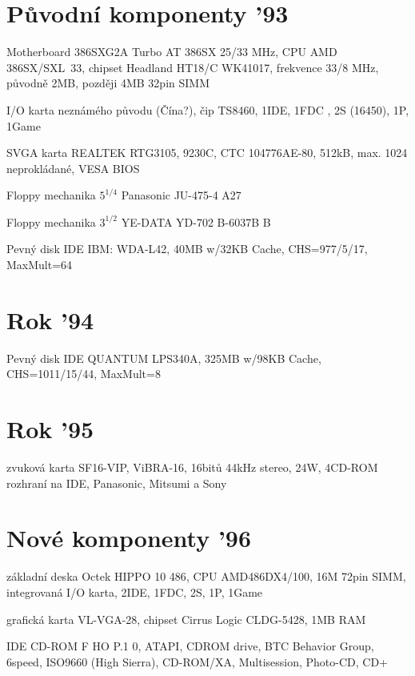 \section{Původní komponenty '93}
\item{\oldsym}
   Motherboard {\sc 386SXG2A Turbo AT 386SX 25/33 MHz}, CPU {\sc AMD
   386SX/SXL~33}, chipset {\sc Headland HT18/C WK41017}, frekvence 33/8 MHz,
   původně 2MB, později 4MB 32pin SIMM
\item{\oldsym}
   I/O karta neznámého původu (Čína?), čip {\sc TS8460}, 1\krat IDE,
    1\krat FDC , 2\krat S
   (16450), 1\krat P, 1\krat Game
\item{\oldsym}
   SVGA karta {\sc REALTEK RTG3105, 9230C}, {\sc CTC 104776AE-80},
   512kB, max. 1024 neprokládané,  VESA BIOS 
\item{\newsym}
   Floppy mechanika $5^{1/4}$ {\sc Panasonic JU-475-4 A27}
\item{\newsym}
   Floppy mechanika $3^{1/2}$ {\sc YE-DATA YD-702 B-6037B B}
\item{\newsym}
   Pevný disk IDE {\sc IBM: WDA-L42, 40MB w/32KB Cache, CHS=977/5/17,
   MaxMult=64}
   
\section{Rok '94}
\item{\newsym}
   Pevný disk IDE {\sc QUANTUM LPS340A, 325MB w/98KB Cache, CHS=1011/15/44,
   MaxMult=8}
\section{Rok '95}
\item{\newsym}
   zvuková karta SF16-VIP, ViBRA-16, 16bitů 44kHz stereo, 2\krat 4W, 4\krat CD-ROM
   rozhraní na IDE, Panasonic, Mitsumi a Sony

\section{Nové komponenty '96}
\item{\newsym}
   základní deska {\sc Octek HIPPO 10 486}, CPU AMD486DX4/100, 16M 72pin
   SIMM, integrovaná I/O karta, 2\krat IDE, 1\krat FDC, 2\krat S, 1\krat P,
   1\krat Game
\item{\newsym}
   grafická karta {\sc VL-VGA-28}, chipset {\sc Cirrus Logic CLDG-5428},
   1MB RAM
\item{\newsym}
   IDE CD-ROM {\sc  F HO P.1 0, ATAPI, CDROM drive}, BTC Behavior Group,
   6\krat speed, ISO9660 (High Sierra), CD-ROM/XA, Multisession, 
   Photo-CD, CD+

